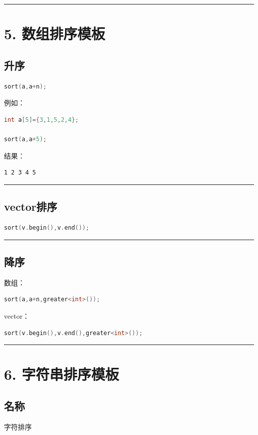 \documentclass[9pt,twocolumn]{extarticle}
\begin{document}
\noindent\rule{\linewidth}{0.4pt}

\section{5. 数组排序模板}

\subsection{升序}
\begin{lstlisting}[language=C++]
sort(a,a+n);
\end{lstlisting}
例如：
\begin{lstlisting}[language=C++]
int a[5]={3,1,5,2,4};

sort(a,a+5);
\end{lstlisting}
结果：
\begin{lstlisting}
1 2 3 4 5
\end{lstlisting}

\noindent\rule{\linewidth}{0.4pt}

\subsection{vector排序}
\begin{lstlisting}[language=C++]
sort(v.begin(),v.end());
\end{lstlisting}

\noindent\rule{\linewidth}{0.4pt}

\subsection{降序}
数组：
\begin{lstlisting}[language=C++]
sort(a,a+n,greater<int>());
\end{lstlisting}
vector：
\begin{lstlisting}[language=C++]
sort(v.begin(),v.end(),greater<int>());
\end{lstlisting}

\noindent\rule{\linewidth}{0.4pt}

\section{6. 字符串排序模板}

\subsection{名称}
字符排序
\end{document}

